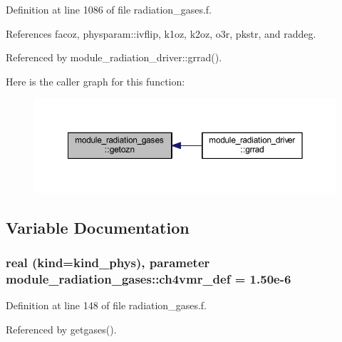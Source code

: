 Definition at line 1086 of file radiation\+\_\+gases.\+f.



References facoz, physparam\+::ivflip, k1oz, k2oz, o3r, pkstr, and raddeg.



Referenced by module\+\_\+radiation\+\_\+driver\+::grrad().



Here is the caller graph for this function\+:
\nopagebreak
\begin{figure}[H]
\begin{center}
\leavevmode
\includegraphics[width=350pt]{namespacemodule__radiation__gases_af4be311f1ec1601a167655c1632d66de_icgraph}
\end{center}
\end{figure}




\subsection{Variable Documentation}
\subsubsection[{\texorpdfstring{ch4vmr\+\_\+def}{ch4vmr_def}}]{\setlength{\rightskip}{0pt plus 5cm}real (kind=kind\+\_\+phys), parameter module\+\_\+radiation\+\_\+gases\+::ch4vmr\+\_\+def = 1.\+50e-\/6\hspace{0.3cm}{\ttfamily [private]}}\hypertarget{namespacemodule__radiation__gases_aad928d9e0064905a0b6e1eb8bb59bd23}{}\label{namespacemodule__radiation__gases_aad928d9e0064905a0b6e1eb8bb59bd23}


Definition at line 148 of file radiation\+\_\+gases.\+f.



Referenced by getgases().

